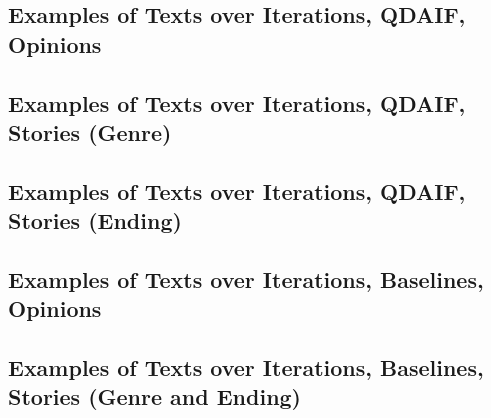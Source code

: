 \subsection{Examples of Texts over Iterations, QDAIF, Opinions}

\clearpage
\newpage

\subsection{Examples of Texts over Iterations, QDAIF, Stories (Genre)}

\clearpage
\newpage

\subsection{Examples of Texts over Iterations, QDAIF, Stories (Ending)}

\clearpage
\newpage

\subsection{Examples of Texts over Iterations, Baselines, Opinions}

\clearpage
\newpage

\subsection{Examples of Texts over Iterations, Baselines, Stories (Genre and Ending)}

\clearpage